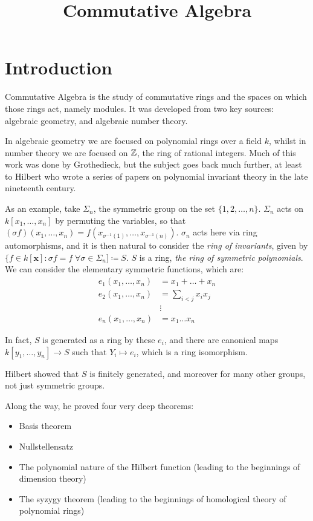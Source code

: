 \documentclass[10pt,a4paper]{article}
\title{Commutative Algebra}
\begin{document}
\maketitle
\tableofcontents
\newpage
\setcounter{section}{-1}
\section{Introduction}
Commutative Algebra is the study of commutative rings and the spaces on which those rings act, namely modules. It was developed from two key sources: algebraic geometry, and algebraic number theory.

In algebraic geometry we are focused on polynomial rings over a field $k$, whilst in number theory we are focused on $\mathbb{Z}$, the ring of rational integers. Much of this work was done by Grothedieck, but the subject goes back much further, at least to Hilbert who wrote a series of papers on polynomial invariant theory in the late nineteenth century.

As an example, take $\Sigma_n$, the symmetric group on the set $\{1,2,\ldots,n\}$. $\Sigma_n$ acts on $k[x_1, \ldots, x_n]$ by permuting the variables, so that $(\sigma f)(x_1, \ldots, x_n) = f(x_{\sigma^{-1}(1)}, \ldots, x_{\sigma^{-1}(n)})$. $\sigma_n$ acts here via ring automorphisms, and it is then natural to consider the \emph{ring of invariants}, given by $\{f\in k[\mathbf{x}]: \sigma f = f\; \forall \sigma \in \Sigma_n] \coloneqq S$. $S$ is a ring, \emph{the ring of symmetric polynomials}. We can consider the elementary symmetric functions, which are:
\begin{align*}
e_1(x_1, \ldots, x_n) &= x_1 + \ldots + x_n\\
e_2(x_1, \ldots, x_n) &= \sum_{i<j} x_ix_j\\
&\vdots \\
e_n(x_1, \ldots, x_n) &= x_1\ldots x_n
\end{align*}

In fact, $S$ is generated as a ring by these $e_i$, and there are canonical maps $k[y_1, \ldots, y_n] \to S$ such that $Y_i \mapsto e_i$, which is a ring isomorphism.

Hilbert showed that $S$ is finitely generated, and moreover for many other groups, not just symmetric groups.

Along the way, he proved four very deep theorems:
\begin{itemize}
\item Basis theorem
\item Nullstellensatz
\item The polynomial nature of the Hilbert function (leading to the beginnings of dimension theory)
\item The syzygy theorem (leading to the beginnings of homological theory of polynomial rings)
\end{itemize}
\end{document}
